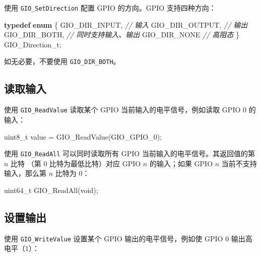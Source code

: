 \documentclass[
  12pt,
]{book}
\makeatletter
\newenvironment{Shaded}{\begin{snugshade}}{\end{snugshade}}
\newcommand{\CommentTok}[1]{\textcolor[rgb]{0.56,0.35,0.01}{\textit{#1}}}
\newcommand{\DataTypeTok}[1]{\textcolor[rgb]{0.13,0.29,0.53}{#1}}
\newcommand{\KeywordTok}[1]{\textcolor[rgb]{0.13,0.29,0.53}{\textbf{#1}}}
\newcommand{\NormalTok}[1]{#1}
\newenvironment{kframe}{%
\medskip{}
\setlength{\fboxsep}{.8em}
 \def\at@end@of@kframe{}%
 \ifinner\ifhmode%
  \def\at@end@of@kframe{\end{minipage}}%
  \begin{minipage}{\columnwidth}%
 \fi\fi%
 \def\FrameCommand##1{\hskip\@totalleftmargin \hskip-\fboxsep
 \colorbox{shadecolor}{##1}\hskip-\fboxsep
     \hskip-\linewidth \hskip-\@totalleftmargin \hskip\columnwidth}%
 \MakeFramed {\advance\hsize-\width
   \@totalleftmargin\z@ \linewidth\hsize
   \@setminipage}}%
 {\par\unskip\endMakeFramed%
 \at@end@of@kframe}
\newenvironment{rmdblock}[1]
  {
  \begin{itemize}
  \renewcommand{\labelitemi}{
    \raisebox{-.7\height}[0pt][0pt]{
      {\setkeys{Gin}{width=3em,keepaspectratio}\texttt{[image: images/\#1]}}
    }
  }
  \setlength{\fboxsep}{1em}
  \begin{kframe}
  \item
  }
  {
  \end{kframe}
  \end{itemize}
  }
\newenvironment{rmdcaution}
  {\begin{rmdblock}{caution}}
  {\end{rmdblock}}
\makeatother
\begin{document}
使用 \texttt{GIO\_SetDirection} 配置 GPIO 的方向。GPIO 支持四种方向：

\begin{Shaded}
\begin{Highlighting}[]
\KeywordTok{typedef} \KeywordTok{enum}
\NormalTok{\{}
\NormalTok{    GIO_DIR_INPUT,  }\CommentTok{// 输入}
\NormalTok{    GIO_DIR_OUTPUT, }\CommentTok{// 输出}
\NormalTok{    GIO_DIR_BOTH,   }\CommentTok{// 同时支持输入、输出}
\NormalTok{    GIO_DIR_NONE    }\CommentTok{// 高阻态}
\NormalTok{\} GIO_Direction_t;}
\end{Highlighting}
\end{Shaded}

\begin{rmdcaution}
如无必要，不要使用 \texttt{GIO\_DIR\_BOTH}。
\end{rmdcaution}

\hypertarget{ux8bfbux53d6ux8f93ux5165}{%
\subsection{读取输入}\label{ux8bfbux53d6ux8f93ux5165}}

使用 \texttt{GIO\_ReadValue} 读取某个 GPIO 当前输入的电平信号，例如读取 GPIO 0 的输入：

\begin{Shaded}
\begin{Highlighting}[]
\DataTypeTok{uint8_t}\NormalTok{ value = GIO_ReadValue(GIO_GPIO_0);}
\end{Highlighting}
\end{Shaded}

使用 \texttt{GIO\_ReadAll} 可以同时读取所有 GPIO 当前输入的电平信号。其返回值的第 \(n\) 比特
（第 0 比特为最低比特）对应 GPIO \(n\) 的输入；如果 GPIO \(n\) 当前不支持输入，那么第 \(n\)
比特为 0：

\begin{Shaded}
\begin{Highlighting}[]
\DataTypeTok{uint64_t}\NormalTok{ GIO_ReadAll(}\DataTypeTok{void}\NormalTok{);}
\end{Highlighting}
\end{Shaded}

\hypertarget{ux8bbeux7f6eux8f93ux51fa}{%
\subsection{设置输出}\label{ux8bbeux7f6eux8f93ux51fa}}

使用 \texttt{GIO\_WriteValue} 设置某个 GPIO 输出的电平信号，例如使 GPIO 0 输出高电平（1）：
\end{document}
